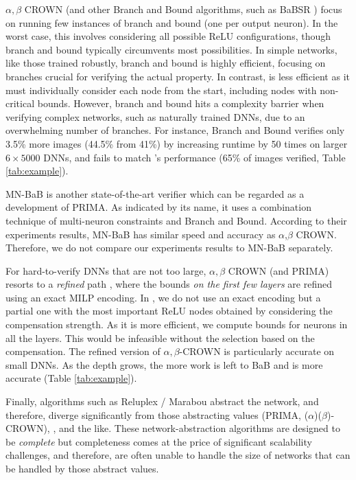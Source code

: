 $\alpha,\beta$ CROWN \cite{crown} (and other Branch and Bound algorithms, such as BaBSR \cite{BaB}) focus on running few instances of branch and bound (one per output neuron).  In the worst case, this involves considering all possible ReLU configurations, though branch and bound typically circumvents most possibilities. In simple networks, like those trained robustly, branch and bound is highly efficient, focusing on branches crucial for verifying the actual property. In contrast, {\CMP} is less efficient as it must individually consider each node from the start, including nodes with non-critical bounds. However, branch and bound hits a complexity barrier when verifying complex networks, such as naturally trained DNNs, due to an overwhelming number of branches. For instance, Branch and Bound verifies only 3.5\% more images (44.5\% from 41\%) by increasing runtime by 50 times on larger $6 \times 5000$ DNNs, and fails to match {\CMP}'s performance (65\% of images verified, Table \ref{tab:example}). 

{\color{red} MN-BaB \cite{ferrari2022complete} is another state-of-the-art verifier which can be regarded as a development of PRIMA. As indicated by its name, it uses a combination technique of multi-neuron constraints and Branch and Bound. According to their experiments results, MN-BaB has similar speed and accuracy as $\alpha$,$\beta$ CROWN. Therefore, we do not compare our experiments results to MN-BaB separately.}

For hard-to-verify DNNs that are not too large,  $\alpha,\beta$ CROWN (and PRIMA) resorts to a {\em refined} path \cite{MILP2}, where the bounds {\em on the first few layers} are refined using an exact MILP encoding. In {\CMP}, we do not use an exact encoding but a partial one with the most important ReLU nodes obtained by considering the compensation strength. As it is more efficient, we compute bounds for neurons in all the layers. This would be infeasible without the selection based on the compensation. The refined version of $\alpha,\beta$-CROWN is particularly accurate on small DNNs. As the depth grows, the more work is left to BaB and \CMP is more accurate (Table \ref{tab:example}).

Finally, algorithms such as Reluplex / Marabou \cite{Reluplex,katz2019marabou}  abstract the network, and therefore,  diverge significantly from those abstracting values (PRIMA, ($\alpha$)($\beta$)-CROWN)\cite{prima,crown}, {\CMP}, and the like. These network-abstraction algorithms are designed to be {\em complete} but completeness comes at the price of significant scalability challenges, and therefore, are often unable to handle the size of networks that can be handled by those abstract values. 

